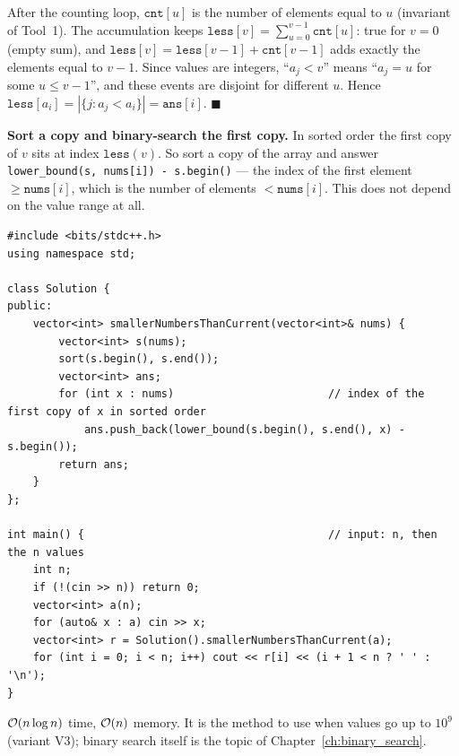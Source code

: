 \begin{invariantbox}
After the counting loop, $\texttt{cnt}[u]$ is the number of elements equal to $u$ (invariant of Tool~1). The accumulation keeps $\texttt{less}[v] = \sum_{u=0}^{v-1} \texttt{cnt}[u]$: true for $v = 0$ (empty sum), and $\texttt{less}[v] = \texttt{less}[v-1] + \texttt{cnt}[v-1]$ adds exactly the elements equal to $v - 1$. Since values are integers, ``$a_j < v$'' means ``$a_j = u$ for some $u \le v-1$'', and these events are disjoint for different $u$. Hence $\texttt{less}[a_i] = |\{ j : a_j < a_i \}| = \texttt{ans}[i]$. \hfill$\blacksquare$
\end{invariantbox}

\begin{alternativebox}
\textbf{Sort a copy and binary-search the first copy.} In sorted order the first copy of $v$ sits at index $\texttt{less}(v)$. So sort a copy of the array and answer \texttt{lower\_bound(s, nums[i]) - s.begin()} --- the index of the first element $\ge \texttt{nums}[i]$, which is the number of elements $< \texttt{nums}[i]$. This does not depend on the value range at all.
\begin{lstlisting}[style=cpp]
#include <bits/stdc++.h>
using namespace std;

class Solution {
public:
    vector<int> smallerNumbersThanCurrent(vector<int>& nums) {
        vector<int> s(nums);
        sort(s.begin(), s.end());
        vector<int> ans;
        for (int x : nums)                        // index of the first copy of x in sorted order
            ans.push_back(lower_bound(s.begin(), s.end(), x) - s.begin());
        return ans;
    }
};

int main() {                                      // input: n, then the n values
    int n;
    if (!(cin >> n)) return 0;
    vector<int> a(n);
    for (auto& x : a) cin >> x;
    vector<int> r = Solution().smallerNumbersThanCurrent(a);
    for (int i = 0; i < n; i++) cout << r[i] << (i + 1 < n ? ' ' : '\n');
}
\end{lstlisting}
$\mathcal{O}(n \log n)$ time, $\mathcal{O}(n)$ memory. It is the method to use when values go up to $10^9$ (variant V3); binary search itself is the topic of Chapter~\ref{ch:binary_search}.

\begin{diagrambox}
\end{diagrambox}
\end{alternativebox}

